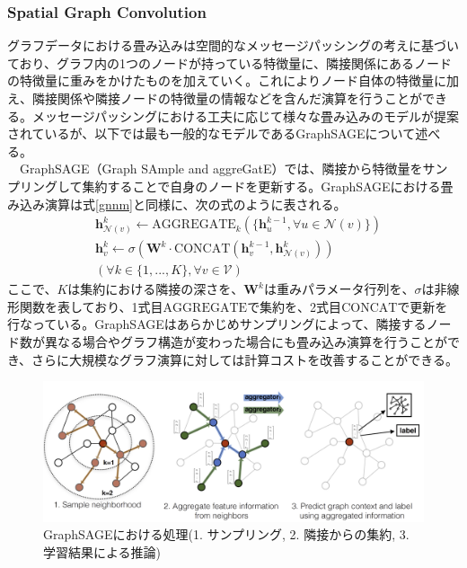 \subsubsection{Spatial Graph Convolution}
グラフデータにおける畳み込みは空間的なメッセージパッシングの考えに基づいており、グラフ内の1つのノードが持っている特徴量に、隣接関係にあるノードの特徴量に重みをかけたものを加えていく。これによりノード自体の特徴量に加え、隣接関係や隣接ノードの特徴量の情報などを含んだ演算を行うことができる。メッセージパッシングにおける工夫に応じて様々な畳み込みのモデルが提案されているが、以下では最も一般的なモデルであるGraphSAGEについて述べる。\\
　GraphSAGE（Graph SAmple and aggreGatE）\cite{graphsage}では、隣接から特徴量をサンプリングして集約することで自身のノードを更新する。GraphSAGEにおける畳み込み演算は式\ref{gnnm}と同様に、次の式のように表される。\\
\begin{align}
&\mathbf{h}_{\mathcal{N}(v)}^k \leftarrow \mathrm{AGGREGATE}_k(\{ \mathbf{h}_u^{k-1}, \forall u \in \mathcal{N}(v) \})\\
&\mathbf{h}_v^k \leftarrow \sigma (\mathbf{W}^k \cdot \mathrm{CONCAT}(\mathbf{h}_v^{k-1}, \mathbf{h}_{\mathcal{N}(v)}^k))\\
&  (\forall k \in \{1, ..., K\}, \forall v \in \mathcal{V}) \nonumber
\end{align}
ここで、$K$は集約における隣接の深さを、$\mathbf{W}^k$は重みパラメータ行列を、$\sigma$は非線形関数を表しており、1式目$\mathrm{AGGREGATE}$で集約を、2式目$\mathrm{CONCAT}$で更新を行なっている。GraphSAGEはあらかじめサンプリングによって、隣接するノード数が異なる場合やグラフ構造が変わった場合にも畳み込み演算を行うことができ、さらに大規模なグラフ演算に対しては計算コストを改善することができる。
\begin{figure}[H]
	\begin{center}
 \includegraphics[keepaspectratio, scale=0.3]
 	{Figure/Deeplearning/sage.png}
 		\caption{GraphSAGEにおける処理(1. サンプリング, 2. 隣接からの集約, 3. 学習結果による推論)}
 		\label{sage}
	\end{center}
\end{figure}
